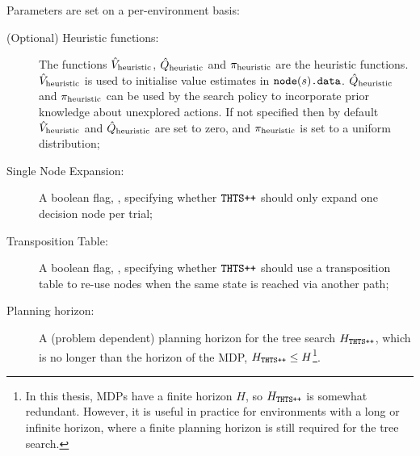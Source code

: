     Parameters are set on a per-environment basis:
    \begin{description}
        \item[(Optional) Heuristic functions:]
            The functions ${\hat{V}_{\textnormal{heuristic}}}$, ${\hat{Q}_{\textnormal{heuristic}}}$ and ${\pi_{\textnormal{heuristic}}}$ are the heuristic functions. ${\hat{V}_{\textnormal{heuristic}}}$ is used to initialise value estimates in ${{\textnormal{\texttt{node}}}(s)\textnormal{\texttt{.data}}}$. ${\hat{Q}_{\textnormal{heuristic}}}$ and ${\pi_{\textnormal{heuristic}}}$ can be used by the search policy to incorporate prior knowledge about unexplored actions. If not specified then by default ${\hat{V}_{\textnormal{heuristic}}}$ and ${\hat{Q}_{\textnormal{heuristic}}}$ are set to zero, and ${\pi_{\textnormal{heuristic}}}$ is set to a uniform distribution;
        \item[Single Node Expansion:]
            A boolean flag, \mctsmode, specifying whether ${\textnormal{\texttt{THTS++}}}$ should only expand one decision node per trial;
        \item[Transposition Table:]
            A boolean flag, \graphmode, specifying whether ${\textnormal{\texttt{THTS++}}}$ should use a transposition table to re-use nodes when the same state is reached via another path;
        \item[Planning horizon:]
            A (problem dependent) planning horizon for the tree search $H_{{\textnormal{\texttt{THTS++}}}}$, which is no longer than the horizon of the MDP, $H_{{\textnormal{\texttt{THTS++}}}}\leq H$\footnote{In this thesis, MDPs have a finite horizon $H$, so $H_{{\textnormal{\texttt{THTS++}}}}$ is somewhat redundant. However, it is useful in practice for environments with a long or infinite horizon, where a finite planning horizon is still required for the tree search.}.
    \end{description}
    
